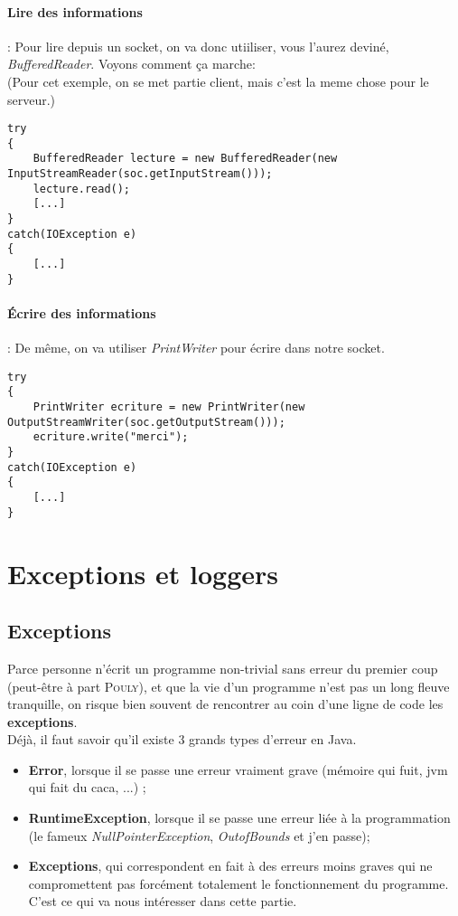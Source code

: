 \documentclass{article}
\begin{document}
\paragraph{Lire des informations} : Pour lire depuis un socket, on va donc utiiliser, vous l'aurez deviné, \emph{BufferedReader}. Voyons comment ça marche:\\
(Pour cet exemple, on se met partie client, mais c'est la meme chose pour le serveur.)
\begin{lstlisting}
try
{
	BufferedReader lecture = new BufferedReader(new InputStreamReader(soc.getInputStream()));
	lecture.read();
	[...]
}
catch(IOException e)
{
	[...]
}
\end{lstlisting}
\paragraph{Écrire des informations} : De même, on va utiliser \emph{PrintWriter} pour écrire dans notre socket.
\begin{lstlisting}
try
{
	PrintWriter ecriture = new PrintWriter(new OutputStreamWriter(soc.getOutputStream()));
	ecriture.write("merci");
}
catch(IOException e)
{
	[...]
}
\end{lstlisting}

\section{Exceptions et loggers}
\subsection{Exceptions}
Parce personne n'écrit un programme non-trivial sans erreur du premier coup (peut-être à part \textsc{Pouly}), et que la vie d'un programme n'est pas un long fleuve tranquille, on risque bien souvent de rencontrer au coin d'une ligne de code les \textbf{exceptions}. \\
Déjà, il faut savoir qu'il existe 3 grands types d'erreur en Java.
\begin{itemize}
\item{\textbf{Error}, lorsque il se passe une erreur vraiment grave (mémoire qui fuit, jvm qui fait du caca, ...) ;}
\item{\textbf{RuntimeException}, lorsque il se passe une erreur liée à la programmation (le fameux \emph{NullPointerException}, \emph{OutofBounds} et j'en passe);}
\item{\textbf{Exceptions}, qui correspondent en fait à des erreurs moins graves qui ne compromettent pas forcément totalement le fonctionnement du programme. C'est ce qui va nous intéresser dans cette partie.}
\end{itemize}
\end{document}

